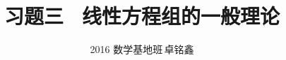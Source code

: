 \documentclass{ctexart}
\title{习题三 \, 线性方程组的一般理论}
\author{2016 数学基地班\,卓铭鑫}
\begin{document}
\maketitle

\begin{quote}
{%
\parindent 0pt
\noindent
\ifx\preLilyPondExample \undefined
\else
  \expandafter\preLilyPondExample
\fi
\def\lilypondbook{}%

\ifx\postLilyPondExample \undefined
\else
  \expandafter\postLilyPondExample
\fi
}
\end{quote}
\end{document}
